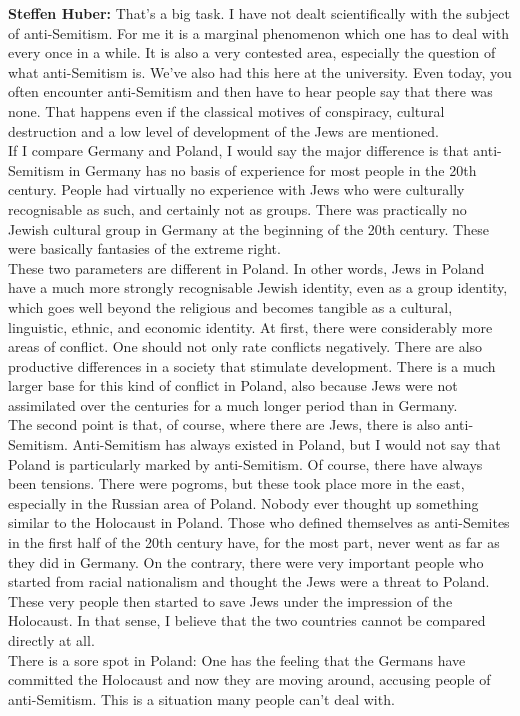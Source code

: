 \textbf{Steffen Huber:} That's a big task. I have not dealt scientifically with the subject of anti-Semitism. For me it is a marginal phenomenon which one has to deal with every once in a while. It is also a very contested area, especially the question of what anti-Semitism is. We’ve also had this here at the university. Even today, you often encounter anti-Semitism and then have to hear people say that there was none. That happens even if the classical motives of conspiracy, cultural destruction and a low level of development of the Jews are mentioned. \\
If I compare Germany and Poland, I would say the major difference is that anti-Semitism in Germany has no basis of experience for most people in the 20th century. People had virtually no experience with Jews who were culturally recognisable as such, and certainly not as groups. There was practically no Jewish cultural group in Germany at the beginning of the 20th century. These were basically fantasies of the extreme right.\\
These two parameters are different in Poland. In other words, Jews in Poland have a much more strongly recognisable Jewish identity, even as a group identity, which goes well beyond the religious and becomes tangible as a cultural, linguistic, ethnic, and economic identity. At first, there were considerably more areas of conflict. One should not only rate conflicts negatively. There are also productive differences in a society that stimulate development. There is a much larger base for this kind of conflict in Poland, also because Jews were not assimilated over the centuries for a much longer period than in Germany.  \\
The second point is that, of course, where there are Jews, there is also anti-Semitism. Anti-Semitism has always existed in Poland, but I would not say that Poland is particularly marked by anti-Semitism. Of course, there have always been tensions. There were pogroms, but these took place more in the east, especially in the Russian area of Poland. Nobody ever thought up something similar to the Holocaust in Poland. Those who defined themselves as anti-Semites in the first half of the 20th century have, for the most part, never went as far as they did in Germany. On the contrary, there were very important people who started from racial nationalism and thought the Jews were a threat to Poland. These very people then started to save Jews under the impression of the Holocaust. In that sense, I believe that the two countries cannot be compared directly at all.\\
There is a sore spot in Poland: One has the feeling that the Germans have committed the Holocaust and now they are moving around, accusing people of anti-Semitism. This is a situation many people can't deal with. 


